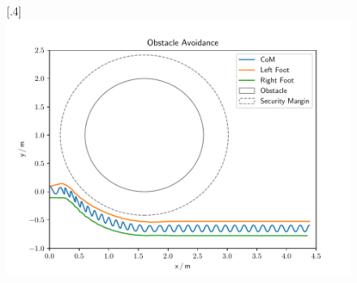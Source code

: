 \begin{figure}[h]
	\subcaptionbox{}%
	[.4\linewidth]{\includegraphics[scale=.35]{chapters/05_experiments/01_user_controlled_walking/01_benchmarking/nmpc_obstacle.pdf}}
	\caption{}
	\label{fig::511_benchmarking_traj}
\end{figure} 
